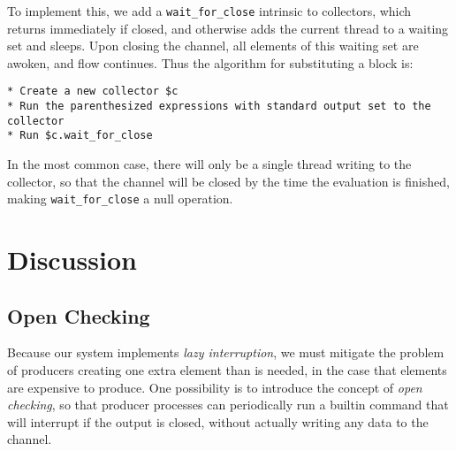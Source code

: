 \ifsigpro{ \documentclass[english,PRO]{ipsj} }
\begin{document}
To implement this, we add a \verb/wait_for_close/ intrinsic to collectors, which returns immediately if closed, and otherwise adds the current thread to a waiting set and sleeps. Upon closing the channel, all elements of this waiting set are awoken, and flow continues. Thus the algorithm for substituting a block is:
\begin{lstlisting}[language={}]
* Create a new collector $c
* Run the parenthesized expressions with standard output set to the collector
* Run $c.wait_for_close
\end{lstlisting}

\noindent
In the most common case, there will only be a single thread writing to the collector, so that the channel will be closed by the time the evaluation is finished, making \verb/wait_for_close/ a null operation.

\section{Discussion}\label{discussion}

\subsection{Open Checking}\noindent
Because our system implements \emph{lazy interruption}, we must mitigate the problem of producers creating one extra element than is needed, in the case that elements are expensive to produce. One possibility is to introduce the concept of \emph{open checking}, so that producer processes can periodically run a builtin command that will interrupt if the output is closed, without actually writing any data to the channel.


\end{document}
